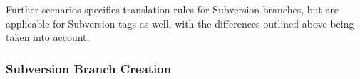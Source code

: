 Further scenarios specifies translation rules for Subversion branches, but are applicable for Subversion tags as well, 
with the differences outlined above being taken into account.

\subsubsection{Subversion Branch Creation}

